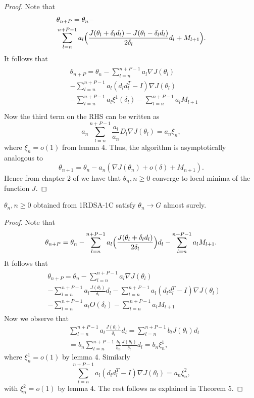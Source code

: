 \begin{proof}
 Note that
 \begin{align*}
  \begin{split}
  & \theta_{n+P} = \theta_n- \\ 
  &\sum_{l=n}^{n+P-1}a_l\Big{(}\frac{J(\theta_l+\delta_l d_l)-J(\theta_l-\delta_l d_l)}{2\delta_l}d_l+M_{l+1}\Big{)}.
 \end{split}
 \end{align*}
It follows that
 \begin{align*}
  \begin{split}
  & \theta_{n+P} = \theta_n- \sum_{l=n}^{n+P-1}a_l\nabla J(\theta_l)\\ 
  & -\sum_{l=n}^{n+P-1}a_l(d_ld_l^T-I)\nabla J(\theta_l)\\
  & -\sum_{l=n}^{n+P-1}a_l \xi^{1}(\delta_l)-\sum_{l=n}^{n+P-1}a_lM_{l+1}\\
  \end{split}
 \end{align*}
Now the third term on the RHS can be written as
$$a_n\sum_{l=n}^{n+P-1}\frac{a_l}{a_n}D_{l}\nabla J(\theta_l)=a_n\xi_{n},$$
where $\xi_{n}=o(1)$ from lemma 4.
Thus, the algorithm is asymptotically analogous to
$$\theta_{n+1}=\theta_n-a_n(\nabla J(\theta_n)+o(\delta)+M_{n+1}).$$
Hence from chapter 2 of \cite{borkar2008stochastic} we have that $\theta_n, n\geq0$ converge to
local minima of the function $J.$
\end{proof}

\begin{theorem}
  $\theta_n, n\geq0$ obtained from 1RDSA-1C satisfy $\theta_n \rightarrow G$
 almost surely.
\end{theorem}
\begin{proof}
Note that
 \begin{align*}
 \theta_{n+P} = \theta_n-\sum_{l=n}^{n+P-1}a_l\Big{(}\frac{J(\theta_l+\delta_l d_l)}{2\delta_l}\Big{)}d_l-\sum_{l=n}^{n+P-1}a_lM_{l+1}.
 \end{align*} 
It follows that
 \begin{align*}
  \begin{split}
  & \theta_{n+P} = \theta_n- \sum_{l=n}^{n+P-1}a_l\nabla J(\theta_l)\\ 
  & -\sum_{l=n}^{n+P-1}a_l\frac{J(\theta_l)}{\delta_l}d_l-\sum_{l=n}^{n+P-1}a_l(d_ld_l^T-I)\nabla J(\theta_l)\\
  & -\sum_{l=n}^{n+P-1}a_lO(\delta_l)
  -\sum_{l=n}^{n+P-1}a_lM_{l+1}
 \end{split}
 \end{align*}
 Now we observe that
 \begin{align*}
 & \sum_{l=n}^{n+P-1}a_l\frac{J(\theta_l)}{\delta_l}d_l= \sum_{l=n}^{n+P-1} b_{l}J(\theta_l)d_l\\
 & = b_n\sum_{l=n}^{n+P-1}\frac{b_l}{b_n}\frac{J(\theta_l)}{\delta_l}d_l=b_n\xi^{1}_{n},
 \end{align*}
 where $\xi^{1}_{n}=o(1)$ by lemma 4. Similarly
 $$\sum_{l=n}^{n+P-1}a_l(d_ld_l^T-I)\nabla J(\theta_l)=a_n\xi^{2}_{n},$$
 with $\xi^{2}_{n}=o(1)$ by lemma 4.
 The rest follows as explained in Theorem 5.
\end{proof}
